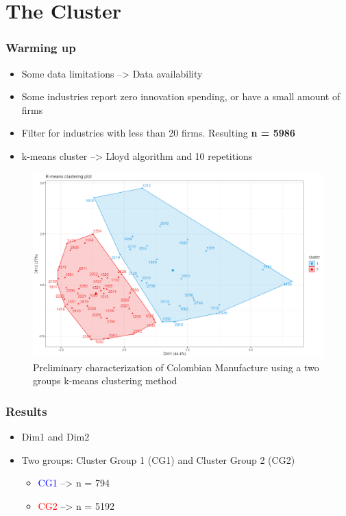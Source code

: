 \documentclass{beamer}
\begin{document}
\section{The Cluster}
	\begin{frame}
		\frametitle{Warming up}
		\begin{itemize}
			\item Some data limitations --> Data availability
			\item Some industries report zero innovation spending, or have a small amount of firms
			\item Filter for industries with less than 20 firms. Resulting \textbf{n = 5986}
			\item k-means cluster --> Lloyd algorithm and 10 repetitions
		\end{itemize}
	\end{frame}
	\begin{frame}
		\begin{figure}[H]	
			\caption{Preliminary characterization of Colombian Manufacture using a two groups k-means clustering method}
			\centering
			\includegraphics[scale = 0.29]{cluster.png}
		\end{figure}
	\end{frame} 
	\begin{frame}
	\frametitle{Results}
	\begin{itemize}
		\item Dim1 and Dim2
		\item Two groups: Cluster Group 1 (CG1) and Cluster Group 2 (CG2)
		\begin{itemize}
			\item \textcolor{blue}{CG1} --> n = 794
			\item \textcolor{red}{CG2}  --> n = 5192
		\end{itemize}
	\end{itemize}
	\end{frame}
\end{document}
